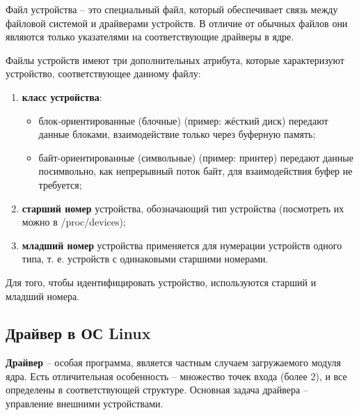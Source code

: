 Файл устройства -- это специальный файл, который обеспечивает связь между файловой системой и драйверами устройств. В отличие от обычных файлов они являются только указателями на соответствующие драйверы в ядре.

Файлы устройств имеют три дополнительных атрибута, которые характеризуют устройство, соответствующее данному файлу:
\begin{enumerate}
	\item \textbf{класс устройства}:
	\begin{itemize}
		\item блок-ориентированные (блочные) (пример: жёсткий диск) передают данные блоками, взаимодействие только через буферную память;
		\item байт-ориентированные (символьные) (пример: принтер) передают данные посимвольно, как непрерывный поток байт, для взаимодействия буфер не требуется;
	\end{itemize}

	\item \textbf{старший номер} устройства, обозначающий тип устройства (посмотреть их можно в /proc/devices);
	
	\item \textbf{младший номер} устройства применяется для нумерации устройств одного типа, т. е. устройств с одинаковыми старшими номерами.
\end{enumerate}

Для того, чтобы идентифицировать устройство, используются старший и младший номера. \cite{os} \newline

\subsection{Драйвер в ОС Linux}
\textbf{Драйвер} -- особая программа, является частным случаем загружаемого модуля ядра.  Есть отличительная особенность -- множество точек входа (более 2), и все определены в соответствующей структуре. Основная задача драйвера -- управление внешними устройствами. \cite{os}

